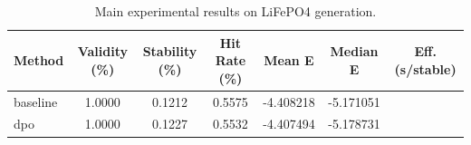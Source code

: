 \begin{table}[h]
\centering
\caption{Main experimental results on LiFePO4 generation.}
\begin{tabular}{lcccccc}
\toprule
Method & Validity (\%) & Stability (\%) & Hit Rate (\%) & Mean E & Median E & Eff. (s/stable) \\
\midrule
baseline & 1.0000 & 0.1212 & 0.5575 & -4.408218 & -5.171051 &  \\
dpo & 1.0000 & 0.1227 & 0.5532 & -4.407494 & -5.178731 &  \\
\bottomrule
\end{tabular}
\label{tab:main_results}
\end{table}

